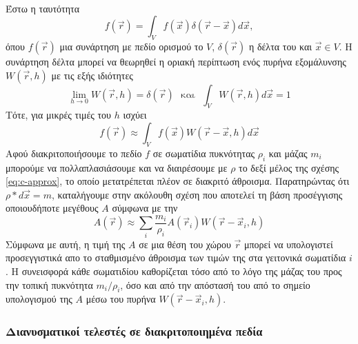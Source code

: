 \paragraph{} Έστω η ταυτότητα
\begin{equation}
  f(\vec{r}) = \int_Vf(\vec{x}) \delta(\vec{r} - \vec{x}) d\vec{x},
\end{equation}
όπου $f(\vec{r})$
μια συνάρτηση με πεδίο ορισμού το $V$, $\delta(\vec{r})$ η δέλτα του  και
$\vec{x} \in V$. Η συνάρτηση δέλτα μπορεί να θεωρηθεί η οριακή περίπτωση ενός πυρήνα
εξομάλυνσης $W(\vec{r}, h)$ με τις εξής ιδιότητες
\begin{equation}
  \label{eq:kernel-properties}
  \lim_{h\to0}W(\vec{r}, h) = \delta(\vec{r})\ \ \
  \text{και}\ \ \
  \int_VW(\vec{r}, h) d\vec{x} = 1
\end{equation}
Τότε, για μικρές τιμές του $h$ ισχύει
\begin{equation}
  \label{eq:c-approx}
  f(\vec{r}) \approx \int_V f(\vec{x}) W(\vec{r}-\vec{x}, h) d\vec{x}
\end{equation}
Αφού διακριτοποιήσουμε το πεδίο $f$
σε σωματίδια πυκνότητας $\rho_i$
και μάζας $m_i$
μπορούμε να πολλαπλασιάσουμε και να διαιρέσουμε με $\rho$
το δεξί μέλος της σχέσης \ref{eq:c-approx}, το οποίο μετατρέπεται πλέον σε διακριτό άθροισμα.
Παρατηρώντας ότι $\rho*d\vec{x} = m$,
καταλήγουμε στην ακόλουθη σχέση που αποτελεί τη βάση προσέγγισης οποιουδήποτε μεγέθους $A$
σύμφωνα με την \eng{SPH}
\begin{equation}
  \label{eq:d-approx}
  A(\vec{r}) \approx \sum_i \frac{m_i}{\rho_i} A(\vec{r}_i) W(\vec{r}-\vec{x}_i, h)
\end{equation}
Σύμφωνα με αυτή, η τιμή της $A$
σε μια θέση του χώρου $\vec{r}$
μπορεί να υπολογιστεί προσεγγιστικά απο το σταθμισμένο άθροισμα των τιμών της στα
γειτονικά σωματίδια $i$.
Η συνεισφορά κάθε σωματιδίου καθορίζεται τόσο από το λόγο της μάζας του προς την τοπική
πυκνότητα $m_i/\rho_i$, όσο και από την απόστασή του από το σημείο υπολογισμού της $A$
μέσω του πυρήνα $W(\vec{r}-\vec{x}_i, h)$.

\subsubsection{Διανυσματικοί τελεστές σε διακριτοποιημένα πεδία}
\label{sssec:vector-calc}
